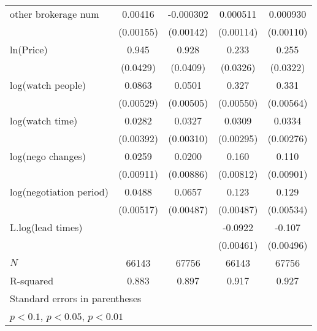 {\begin{tabular}{l*{4}{c}}
\addlinespace
other brokerage num  &     0.00416\sym{***}&   -0.000302         &    0.000511         &    0.000930         \\
            &   (0.00155)         &   (0.00142)         &   (0.00114)         &   (0.00110)         \\
\addlinespace
ln(Price)&       0.945\sym{***}&       0.928\sym{***}&       0.233\sym{***}&       0.255\sym{***}\\
            &    (0.0429)         &    (0.0409)         &    (0.0326)         &    (0.0322)         \\
\addlinespace
log(watch people)&      0.0863\sym{***}&      0.0501\sym{***}&       0.327\sym{***}&       0.331\sym{***}\\
            &   (0.00529)         &   (0.00505)         &   (0.00550)         &   (0.00564)         \\
\addlinespace
log(watch time)&      0.0282\sym{***}&      0.0327\sym{***}&      0.0309\sym{***}&      0.0334\sym{***}\\
            &   (0.00392)         &   (0.00310)         &   (0.00295)         &   (0.00276)         \\
\addlinespace
log(nego changes)&      0.0259\sym{***}&      0.0200\sym{**} &       0.160\sym{***}&       0.110\sym{***}\\
            &   (0.00911)         &   (0.00886)         &   (0.00812)         &   (0.00901)         \\
\addlinespace
log(negotiation period)&      0.0488\sym{***}&      0.0657\sym{***}&       0.123\sym{***}&       0.129\sym{***}\\
            &   (0.00517)         &   (0.00487)         &   (0.00487)         &   (0.00534)         \\
\addlinespace
L.log(lead times)   &                     &                     &     -0.0922\sym{***}&      -0.107\sym{***}\\
            &                     &                     &   (0.00461)         &   (0.00496)         \\
\midrule
\(N\)       &       66143         &       67756         &       66143         &       67756         \\
R-squared   &       0.883         &       0.897         &       0.917         &       0.927         \\
\bottomrule
\multicolumn{5}{l}{\footnotesize Standard errors in parentheses}\\
\multicolumn{5}{l}{\footnotesize \sym{*} \(p<0.1\), \sym{**} \(p<0.05\), \sym{***} \(p<0.01\)}\\
\end{tabular}
}
